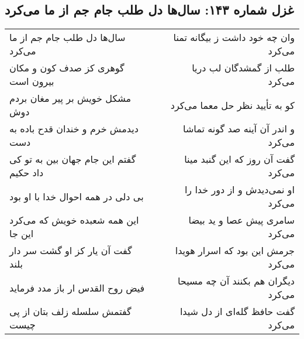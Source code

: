 \begin{center}
\section*{غزل شماره ۱۴۳: سال‌ها دل طلب جام جم از ما می‌کرد}
\label{sec:sh143}
\begin{longtable}{l p{0.5cm} r}
سال‌ها دل طلب جام جم از ما می‌کرد
&&
وان چه خود داشت ز بیگانه تمنا می‌کرد
\\
گوهری کز صدف کون و مکان بیرون است
&&
طلب از گمشدگان لب دریا می‌کرد
\\
مشکل خویش بر پیر مغان بردم دوش
&&
کو به تأیید نظر حل معما می‌کرد
\\
دیدمش خرم و خندان قدح باده به دست
&&
و اندر آن آینه صد گونه تماشا می‌کرد
\\
گفتم این جام جهان بین به تو کی داد حکیم
&&
گفت آن روز که این گنبد مینا می‌کرد
\\
بی دلی در همه احوال خدا با او بود
&&
او نمی‌دیدش و از دور خدا را می‌کرد
\\
این همه شعبده خویش که می‌کرد این جا
&&
سامری پیش عصا و ید بیضا می‌کرد
\\
گفت آن یار کز او گشت سر دار بلند
&&
جرمش این بود که اسرار هویدا می‌کرد
\\
فیض روح القدس ار باز مدد فرماید
&&
دیگران هم بکنند آن چه مسیحا می‌کرد
\\
گفتمش سلسله زلف بتان از پی چیست
&&
گفت حافظ گله‌ای از دل شیدا می‌کرد
\\
\end{longtable}
\end{center}
